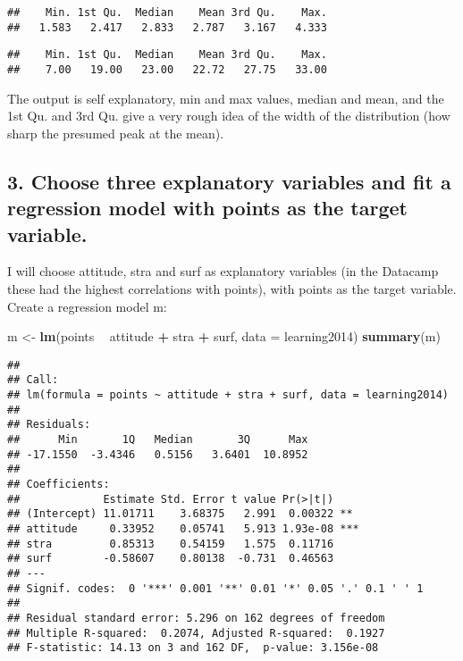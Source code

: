 \documentclass[
]{article}
\newenvironment{Shaded}{\begin{snugshade}}{\end{snugshade}}
\newcommand{\DataTypeTok}[1]{\textcolor[rgb]{0.13,0.29,0.53}{#1}}
\newcommand{\KeywordTok}[1]{\textcolor[rgb]{0.13,0.29,0.53}{\textbf{#1}}}
\newcommand{\NormalTok}[1]{#1}
\newcommand{\OperatorTok}[1]{\textcolor[rgb]{0.81,0.36,0.00}{\textbf{#1}}}
\newcommand{\StringTok}[1]{\textcolor[rgb]{0.31,0.60,0.02}{#1}}
\begin{document}
\begin{verbatim}
##    Min. 1st Qu.  Median    Mean 3rd Qu.    Max. 
##   1.583   2.417   2.833   2.787   3.167   4.333
\end{verbatim}

\begin{Shaded}
\end{Shaded}

\begin{verbatim}
##    Min. 1st Qu.  Median    Mean 3rd Qu.    Max. 
##    7.00   19.00   23.00   22.72   27.75   33.00
\end{verbatim}

The output is self explanatory, min and max values, median and mean, and
the 1st Qu. and 3rd Qu. give a very rough idea of the width of the
distribution (how sharp the presumed peak at the mean).

\hypertarget{choose-three-explanatory-variables-and-fit-a-regression-model-with-points-as-the-target-variable.}{%
\subsection{3. Choose three explanatory variables and fit a regression
model with points as the target
variable.}\label{choose-three-explanatory-variables-and-fit-a-regression-model-with-points-as-the-target-variable.}}

I will choose attitude, stra and surf as explanatory variables (in the
Datacamp these had the highest correlations with points), with points as
the target variable. Create a regression model m:

\begin{Shaded}
\begin{Highlighting}[]
\NormalTok{m <-}\StringTok{ }\KeywordTok{lm}\NormalTok{(points }\OperatorTok{~}\StringTok{ }\NormalTok{attitude }\OperatorTok{+}\StringTok{ }\NormalTok{stra }\OperatorTok{+}\StringTok{ }\NormalTok{surf, }\DataTypeTok{data =}\NormalTok{ learning2014)}
\KeywordTok{summary}\NormalTok{(m)}
\end{Highlighting}
\end{Shaded}

\begin{verbatim}
## 
## Call:
## lm(formula = points ~ attitude + stra + surf, data = learning2014)
## 
## Residuals:
##      Min       1Q   Median       3Q      Max 
## -17.1550  -3.4346   0.5156   3.6401  10.8952 
## 
## Coefficients:
##             Estimate Std. Error t value Pr(>|t|)    
## (Intercept) 11.01711    3.68375   2.991  0.00322 ** 
## attitude     0.33952    0.05741   5.913 1.93e-08 ***
## stra         0.85313    0.54159   1.575  0.11716    
## surf        -0.58607    0.80138  -0.731  0.46563    
## ---
## Signif. codes:  0 '***' 0.001 '**' 0.01 '*' 0.05 '.' 0.1 ' ' 1
## 
## Residual standard error: 5.296 on 162 degrees of freedom
## Multiple R-squared:  0.2074, Adjusted R-squared:  0.1927 
## F-statistic: 14.13 on 3 and 162 DF,  p-value: 3.156e-08
\end{verbatim}
\end{document}
